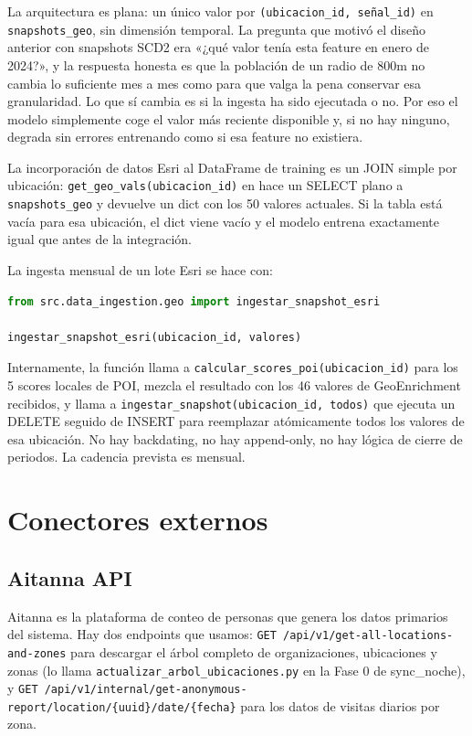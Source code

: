 \documentclass[12pt, a4paper]{article}
\begin{document}
La arquitectura es plana: un único valor por \texttt{(ubicacion\_id, señal\_id)} en \texttt{snapshots\_geo}, sin dimensión temporal. La pregunta que motivó el diseño anterior con snapshots SCD2 era «¿qué valor tenía esta feature en enero de 2024?», y la respuesta honesta es que la población de un radio de 800m no cambia lo suficiente mes a mes como para que valga la pena conservar esa granularidad. Lo que sí cambia es si la ingesta ha sido ejecutada o no. Por eso el modelo simplemente coge el valor más reciente disponible y, si no hay ninguno, degrada sin errores entrenando como si esa feature no existiera.

La incorporación de datos Esri al DataFrame de training es un JOIN simple por ubicación: \texttt{get\_geo\_vals(ubicacion\_id)} en  hace un SELECT plano a \texttt{snapshots\_geo} y devuelve un dict con los 50 valores actuales. Si la tabla está vacía para esa ubicación, el dict viene vacío y el modelo entrena exactamente igual que antes de la integración.

La ingesta mensual de un lote Esri se hace con:

\begin{lstlisting}[language=Python]
from src.data_ingestion.geo import ingestar_snapshot_esri

ingestar_snapshot_esri(ubicacion_id, valores)
\end{lstlisting}

Internamente, la función llama a \texttt{calcular\_scores\_poi(ubicacion\_id)} para los 5 scores locales de POI, mezcla el resultado con los 46 valores de GeoEnrichment recibidos, y llama a \texttt{ingestar\_snapshot(ubicacion\_id, todos)} que ejecuta un DELETE seguido de INSERT para reemplazar atómicamente todos los valores de esa ubicación. No hay backdating, no hay append-only, no hay lógica de cierre de periodos. La cadencia prevista es mensual.

\section{Conectores externos}

\subsection{Aitanna API}

Aitanna es la plataforma de conteo de personas que genera los datos primarios del sistema. Hay dos endpoints que usamos: \texttt{GET /api/v1/get-all-locations-and-zones} para descargar el árbol completo de organizaciones, ubicaciones y zonas (lo llama \texttt{actualizar\_arbol\_ubicaciones.py} en la Fase 0 de sync\_noche), y \texttt{GET /api/v1/internal/get-anonymous-report/location/\{uuid\}/date/\{fecha\}} para los datos de visitas diarios por zona.
\end{document}
